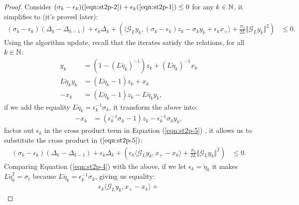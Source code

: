 \documentclass[12pt]{article}
\begin{document}
\begin{proof}
        Consider $(\sigma_k - \epsilon_k)(\ref*{eqn:st2p-2}) + \epsilon_k(\ref*{eqn:st2p-1}) \le 0$ for any $k \in \mathbb N$, it simplifies to (it's proved later):
        {\small
        \begin{align}
            (\sigma_k - \epsilon_k)(\Delta_k - \Delta_{k - 1}) + \epsilon_k \Delta_k 
            + 
            \left(
                \langle 
                    \mathcal G_L y_k, (\sigma_k - \epsilon_k)z_k - \sigma_k y_k + \epsilon_k x_+
                \rangle
                + 
                \frac{\sigma_k}{2L}\Vert \mathcal G_L y_k\Vert^2
            \right) &\le 0. 
            \label{eqn:st2p-5}
        \end{align}
        }
        Using the algorithm update, recall that the iterates satisfy the relations, for all $k \in \mathbb N$: 
        \begin{align*}
            y_k &= (1 - (L \tilde \eta_k)^{-1})z_k + (L\tilde \eta_k)^{-1}x_k
            \\
            L\tilde \eta_k y_k &= 
            (L \tilde \eta_k - 1)z_k + x_k
            \\
            -x_k &= 
            (L\tilde \eta_k - 1)z_k - L \tilde \eta_k y_k, 
        \end{align*}
        if we add the equality $L\tilde \eta_k = \epsilon_k^{-1}\sigma_k$, it transform the above into:
        \begin{align*}
            -x_k &= (\epsilon_k^{-1}\sigma_k - 1)z_k - \epsilon_k^{-1}\sigma_k y_k,
        \end{align*}
        factor out $\epsilon_k$ in the cross product term in Equation (\ref*{eqn:st2p-5}) , it allows us to substitute the cross product in $(\ref*{eqn:st2p-5})$: 
        \begin{align}
            (\sigma_k - \epsilon_k)(\Delta_k - \Delta_{k - 1}) + \epsilon_k \Delta_k 
            + 
            \left(
                \epsilon_k 
                \langle \mathcal G_L y_k, x_+ - x_k\rangle
                + 
                \frac{\sigma_k}{2L}\Vert \mathcal G_L y_k\Vert^2
            \right) &\le 0. 
            \label{eqn:st2p-5.1}
        \end{align}
        Comparing 
        Equation (\ref*{eqn:st2p-4}) 
        with the above, if we let $\epsilon_k = \tilde \eta_k$ it makes $L \tilde \eta_k^2 = \sigma_t$ because $L\tilde \eta_k = \epsilon_k^{-1} \sigma_k$, giving us equality: 
        \begin{align*}
            \epsilon_k \langle  \mathcal G_Ly_k, x_+ - x_k\rangle + 

\end{align*}
\end{proof}
\end{document}
